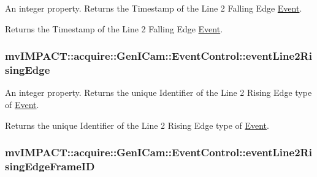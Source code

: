 An integer property. Returns the Timestamp of the Line 2 Falling Edge \hyperlink{classmv_i_m_p_a_c_t_1_1acquire_1_1_event}{Event}. 

Returns the Timestamp of the Line 2 Falling Edge \hyperlink{classmv_i_m_p_a_c_t_1_1acquire_1_1_event}{Event}. \hypertarget{classmv_i_m_p_a_c_t_1_1acquire_1_1_gen_i_cam_1_1_event_control_a134d37a9bbcf3a7fcab17f80704348db}{
\subsubsection[{event\+Line2\+Rising\+Edge}]{ mv\+I\+M\+P\+A\+C\+T\+::acquire\+::\+Gen\+I\+Cam\+::\+Event\+Control\+::event\+Line2\+Rising\+Edge}}\label{classmv_i_m_p_a_c_t_1_1acquire_1_1_gen_i_cam_1_1_event_control_a134d37a9bbcf3a7fcab17f80704348db}


An integer property. Returns the unique Identifier of the Line 2 Rising Edge type of \hyperlink{classmv_i_m_p_a_c_t_1_1acquire_1_1_event}{Event}. 

Returns the unique Identifier of the Line 2 Rising Edge type of \hyperlink{classmv_i_m_p_a_c_t_1_1acquire_1_1_event}{Event}. \hypertarget{classmv_i_m_p_a_c_t_1_1acquire_1_1_gen_i_cam_1_1_event_control_af01ee6d71d738c30ed1e5a7cdcd439da}{
\subsubsection[{event\+Line2\+Rising\+Edge\+Frame\+I\+D}]{ mv\+I\+M\+P\+A\+C\+T\+::acquire\+::\+Gen\+I\+Cam\+::\+Event\+Control\+::event\+Line2\+Rising\+Edge\+Frame\+I\+D}}\label{classmv_i_m_p_a_c_t_1_1acquire_1_1_gen_i_cam_1_1_event_control_af01ee6d71d738c30ed1e5a7cdcd439da}


